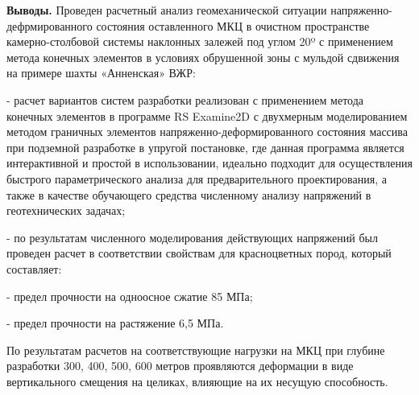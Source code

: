 \begin{multicols}{2}
{\bfseries Выводы.} Проведен расчетный анализ геомеханической ситуации
напряженно-дефрмированного состояния оставленного МКЦ в очистном
пространстве камерно-столбовой системы наклонных залежей под углом 20º с
применением метода конечных элементов в условиях обрушенной зоны с
мульдой сдвижения на примере шахты «Анненская» ВЖР:

- расчет вариантов систем разработки реализован с применением метода
конечных элементов в программе RS Examine2D с двухмерным моделированием
методом граничных элементов напряженно-деформированного состояния
массива при подземной разработке в упругой постановке, где данная
программа является интерактивной и простой в использовании, идеально
подходит для осуществления быстрого параметрического анализа для
предварительного проектирования, а также в качестве обучающего средства
численному анализу напряжений в геотехнических задачах;

- по результатам численного моделирования действующих напряжений был
проведен расчет в соответствии свойствам для красноцветных пород,
который составляет:

- предел прочности на одноосное сжатие 85 МПа;

- предел прочности на растяжение 6,5 МПа.

По результатам расчетов на соответствующие нагрузки на МКЦ при глубине
разработки 300, 400, 500, 600 метров проявляются деформации в виде
вертикального смещения на целиках, влияющие на их несущую способность.
\end{multicols}

